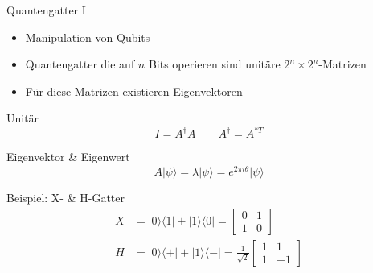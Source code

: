 \documentclass[compress,aspectratio=1610]{beamer}
\begin{document}
\begin{frame}{Quantengatter I}
  \begin{itemize}
  \item Manipulation von Qubits
  \item Quantengatter die auf $n$ Bits operieren sind unit\"are $2^n\times 2^n$-Matrizen
  \item Für diese Matrizen existieren Eigenvektoren 
  \end{itemize}
  \begin{minipage}{0.45\textwidth}
    \begin{block}{Unit\"ar}
      \begin{equation}\nonumber
        \boxed{I = A^{\dagger}A} \qquad A^{\dagger} = A^{\ast T}
      \end{equation}
    \end{block}
    \begin{block}{Eigenvektor \& Eigenwert}
      $$A|\psi\rangle = \lambda |\psi\rangle = e^{2\pi i \theta}|\psi\rangle$$
    \end{block}
  \end{minipage}
  \hfill
  \begin{minipage}{0.45\textwidth}
    \begin{block}{Beispiel: X- \& H-Gatter}
      \begin{equation}\nonumber
        \begin{aligned}
          X &= |0\rangle\langle1|+|1\rangle\langle0| =
          \begin{bmatrix}
            0 & 1 \\
            1 & 0
          \end{bmatrix}\\[1em]
          H &= |0\rangle\langle+|+|1\rangle\langle-| = \frac{1}{\sqrt{2}}
          \begin{bmatrix}
            1 & 1 \\
            1 & -1
          \end{bmatrix}
        \end{aligned}
      \end{equation}
    \end{block}
  \end{minipage}
\end{frame}
\end{document}
